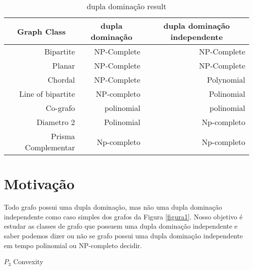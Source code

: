\documentclass[a4paper,8pt]{article}
\theoremstyle{plain}
\begin{document}
\newpage
\begin{center}
\begin{table}
\begin{tabular}{|r|r|r|}

    

\hline
\multicolumn{1}{|c|}{Graph Class} &
\multicolumn{1}{|c|}{ dupla dominação} &
\multicolumn{1}{|c|}{ dupla dominação independente}\\


\hline

Bipartite&NP-Complete &NP-Complete\\ 

Planar&NP-Complete &NP-Complete\\ 

Chordal&NP-Complete&Polynomial\\ 

Line of bipartite &NP-completo&Polinomial\\ 

Co-grafo &polinomial&polinomial\\ 

Diametro 2&Polinomial&Np-completo\\ 

Prisma Complementar&Np-completo&Np-completo\\ 


\hline 

\end{tabular}
\caption{dupla dominação result}
\label{tab:my_label_1}

\normalsize
\end{table}
\end{center} 
\section{Motivação}
Todo grafo possui uma dupla dominação, mas não uma dupla dominação independente como caso simples dos grafos da Figura \ref{figura1}. Nosso objetivo é estudar as classes de grafo que possuem uma dupla dominação independente e saber podemos dizer ou não se grafo possui uma dupla dominação independente em tempo polinomial ou NP-completo decidir.



$P_{3}$ Convexity
\end{document}
